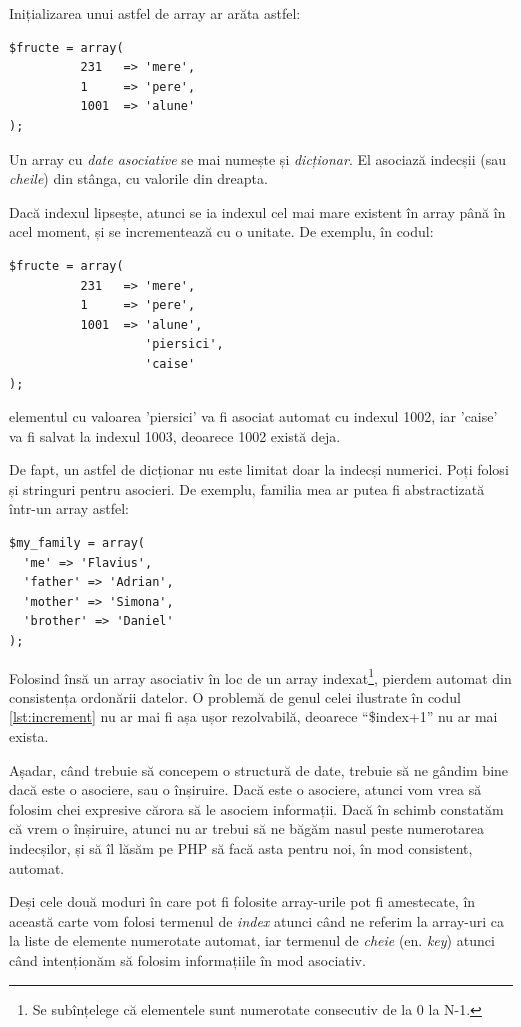 Inițializarea unui astfel de array ar arăta astfel:
\begin{lstlisting}
$fructe = array(
		  231	=> 'mere',
		  1		=> 'pere',
		  1001	=> 'alune'
);
\end{lstlisting}
Un array cu \textsl{date asociative} se mai numește și \textsl{dicționar}. El asociază
indecșii (sau \textsl{cheile}) din stânga, cu valorile din dreapta.


Dacă indexul lipsește, atunci se ia indexul cel mai mare
existent în array până în acel moment, și se incrementează cu o unitate.
De exemplu, în codul:
\begin{lstlisting}
$fructe = array(
		  231	=> 'mere',
		  1		=> 'pere',
		  1001	=> 'alune',
				   'piersici',
				   'caise'
);
\end{lstlisting}
elementul cu valoarea 'piersici' va fi asociat automat cu indexul 1002, iar 'caise'
va fi salvat la indexul 1003, deoarece 1002 există deja.

De fapt, un astfel de dicționar nu este limitat doar la indecși numerici.
Poți folosi și stringuri pentru asocieri. De exemplu, familia mea
ar putea fi abstractizată într-un array astfel:

\begin{lstlisting}
$my_family = array(
  'me' => 'Flavius',
  'father' => 'Adrian',
  'mother' => 'Simona',
  'brother' => 'Daniel'
);
\end{lstlisting}

Folosind însă un array asociativ în loc de un array indexat\footnote{Se subînțelege
că elementele sunt numerotate consecutiv de la 0 la N-1.}, pierdem automat
din consistența ordonării datelor. O problemă de genul celei ilustrate în
codul \ref{lst:increment} nu ar mai fi așa ușor rezolvabilă, deoarece ``\$index+1''
nu ar mai exista.

Așadar, când trebuie să concepem o structură de date, trebuie să ne gândim
bine dacă este o asociere, sau o înșiruire. Dacă este o asociere, atunci
vom vrea să folosim chei expresive cărora să le asociem informații. Dacă
în schimb constatăm că vrem o înșiruire, atunci nu ar trebui să
ne băgăm nasul peste numerotarea indecșilor, și să îl lăsăm pe PHP
să facă asta pentru noi, în mod consistent, automat.

Deși cele două moduri în care pot fi folosite array-urile pot fi amestecate,
în această carte vom folosi termenul de \textsl{index} atunci când ne referim la
array-uri ca la liste de elemente numerotate automat, iar termenul de \textsl{cheie} (en. \textsl{key})
atunci când intenționăm să folosim informațiile în mod asociativ.

